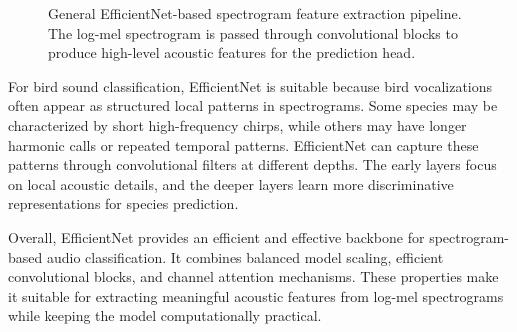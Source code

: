 \documentclass[a4paper,12pt]{article}
\begin{document}
\begin{figure}[htbp]
\centering
{}
\caption{General EfficientNet-based spectrogram feature extraction pipeline. The log-mel spectrogram is passed through convolutional blocks to produce high-level acoustic features for the prediction head.}
\label{fig:efficientnet-general}
\end{figure}

For bird sound classification, EfficientNet is suitable because bird vocalizations often appear as structured local patterns in spectrograms. Some species may be characterized by short high-frequency chirps, while others may have longer harmonic calls or repeated temporal patterns. EfficientNet can capture these patterns through convolutional filters at different depths. The early layers focus on local acoustic details, and the deeper layers learn more discriminative representations for species prediction.

Overall, EfficientNet provides an efficient and effective backbone for spectrogram-based audio classification. It combines balanced model scaling, efficient convolutional blocks, and channel attention mechanisms. These properties make it suitable for extracting meaningful acoustic features from log-mel spectrograms while keeping the model computationally practical.
\end{document}
